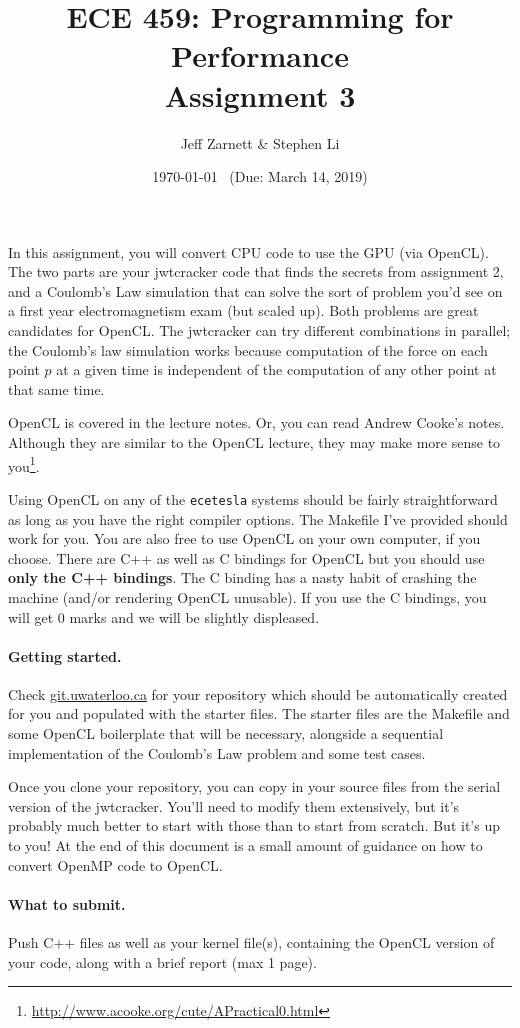 \documentclass[letterpaper,10pt]{article}
\title{\bf ECE 459: Programming for Performance\\Assignment 3}
\author{Jeff Zarnett \& Stephen Li}
\date{\today ~ (Due: March 14, 2019)}
\begin{document}
\maketitle

In this assignment, you will convert CPU code to use the GPU (via OpenCL). 
The two parts are your jwtcracker code that finds the secrets
from assignment 2, and a Coulomb's Law  simulation that can solve the 
sort of problem you'd see on a first year electromagnetism exam (but scaled up).
Both problems are great candidates for OpenCL. The jwtcracker can try different
combinations in parallel; the Coulomb's law simulation works because computation
 of the force on each point $p$ at a given time is
independent of the computation of any other point at that same time. 

OpenCL is covered in the lecture notes. Or, you can read Andrew Cooke's notes. Although 
they are similar to the OpenCL lecture, they may make more sense to you\footnote{\url{http://www.acooke.org/cute/APractical0.html}}.

Using OpenCL on any of the \texttt{ecetesla} systems
 should be fairly straightforward as long as
you have the right compiler options. The Makefile I've provided
should work for you. You are also free to use OpenCL on your own
computer, if you choose. There are C++ as well as C bindings for OpenCL but you 
should use \textbf{only the C++ bindings}. The C binding has a nasty habit of 
crashing the machine (and/or rendering OpenCL unusable). If you use the C bindings, 
you will get 0 marks and we will be slightly displeased.

\paragraph{Getting started.} 
Check \url{git.uwaterloo.ca} for your repository which should 
be automatically created for you and populated with the starter files. The starter 
files are the Makefile and some OpenCL boilerplate that will be necessary, alongside 
a sequential implementation of the Coulomb's Law problem and some test cases.


Once you clone your repository, you can copy in your source files from 
the serial version of the jwtcracker.
You'll need to 
modify them extensively, but it's probably much better to start with those than to 
start from scratch. But it's up to you! At the end of this document is a small amount
of guidance on how to convert OpenMP code to OpenCL.

\paragraph{What to submit.} Push C++ files as well as your kernel file(s), containing 
the OpenCL version of your code, along with a brief report (max 1 page).
\end{document}
